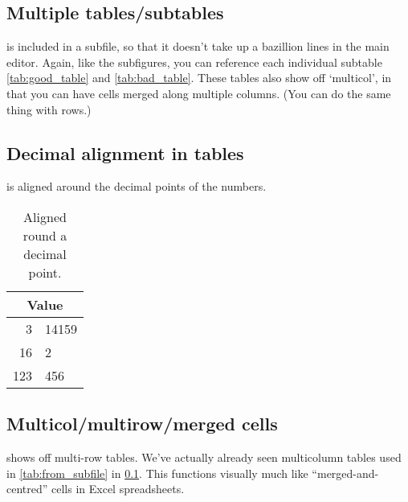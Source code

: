 \documentclass[../main]{subfiles}
\begin{document}
\subsection{Multiple tables/subtables}\label{sub:subtables}

 is included in a subfile, so that it doesn't take up a bazillion lines in the main editor. Again, like the subfigures, you can reference each individual subtable \cref{tab:good_table} and \cref{tab:bad_table}. These tables also show off `multicol', in that you can have cells merged along multiple columns. (You can do the same thing with rows.)




\subsection{Decimal alignment in tables}

 is aligned around the decimal points of the numbers.

\begin{table}[htbp]
\centering
    \begin{tabular}{r@{.}l}
    \toprule
    \multicolumn{2}{c}{Value} \\
    \midrule
    3   & 14159 \\
    16  & 2     \\
    123 & 456   \\
    \bottomrule
    \end{tabular}
\caption{Aligned round a decimal point.}
\label{tab:decimals}
\end{table}

\subsection{Multicol/multirow/merged cells}\label{sub:merged_cells}

 shows off multi-row tables. We've actually already seen multicolumn tables used in \cref{tab:from_subfile} in \cref{sub:subtables}. This functions visually much like ``merged-and-centred'' cells in Excel spreadsheets.
\end{document}

